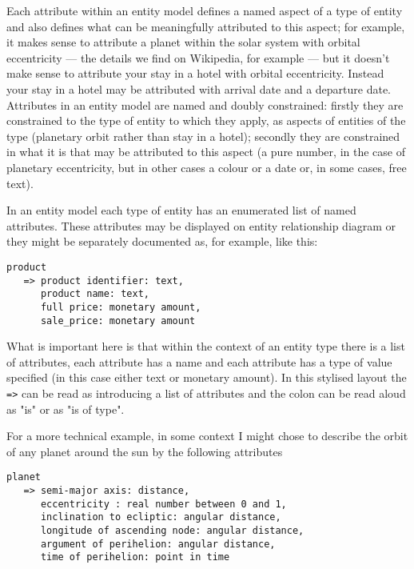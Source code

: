 \mynote 
Each attribute within an entity model defines a named aspect of a type of entity and
also defines what can be meaningfully attributed to this aspect; 
for example, it makes sense to  attribute a planet within the solar system with
 orbital eccentricity
  --- the details we find on Wikipedia, for example --- 
 but it doesn't make sense to attribute your stay in a hotel with orbital eccentricity. 
 Instead your stay in a hotel may be attributed with arrival date and a departure date.
Attributes in an entity model are named and doubly constrained:
firstly they are constrained to the type of entity to which they apply, 
as aspects of entities of the type (planetary orbit rather than stay in a hotel);
secondly they are constrained in what it is that may be attributed to this aspect 
(a pure number, in the case of planetary eccentricity, 
but in other cases a colour or a date or, in
some cases, free text).

\mynote
In an entity model each type of entity has an enumerated list of named attributes. These attributes may be displayed on entity relationship diagram or they might be separately documented as, for example,
 like this:
\begin{verbatim}
product 
   => product identifier: text,
      product name: text,
      full price: monetary amount,
      sale_price: monetary amount
\end{verbatim}

What is important here is that within the context of an entity type there is a list of attributes, each attribute has a name and each attribute has a type of value specified (in this case either text or monetary amount). In this stylised layout the \verb!=>! can be read as introducing a list of attributes and the colon can be read aloud as "is" or as "is of type". 

For a more technical example, in some context I might chose to describe the orbit of any planet around the sun by the following attributes
\begin{verbatim}
planet 
   => semi-major axis: distance,
      eccentricity : real number between 0 and 1,
      inclination to ecliptic: angular distance,
      longitude of ascending node: angular distance,
      argument of perihelion: angular distance,
      time of perihelion: point in time
\end{verbatim}

